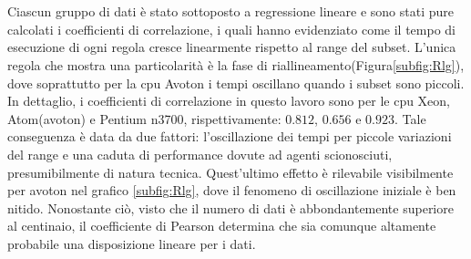 \begin{figure}[H]
\centering
{} \quad
{} \\
\end{figure}
\begin{figure}[H]
\ContinuedFloat
\centering
{} \quad
{} \\
\end{figure}
\begin{figure}[H]
\ContinuedFloat
\centering
{} 
\caption{}
\label{fig:Tdip}
\end{figure}

Ciascun gruppo di dati è stato sottoposto a regressione lineare e sono stati pure calcolati i coefficienti di correlazione, i quali hanno evidenziato come il tempo di esecuzione di ogni regola cresce linearmente rispetto al range del subset.
L'unica regola che mostra una particolarità è la fase di riallineamento(Figura\ref{subfig:Rlg}), dove soprattutto per la cpu Avoton i tempi oscillano quando i subset sono piccoli. 
In dettaglio, i coefficienti di correlazione in questo lavoro sono per le cpu Xeon, Atom(avoton) e Pentium n3700, rispettivamente: $0.812$, $0.656$ e $0.923$. 
Tale conseguenza è data da due fattori: l'oscillazione dei tempi per piccole variazioni del range e una caduta di performance dovute ad agenti scionosciuti, presumibilmente di natura tecnica.
Quest'ultimo effetto è rilevabile visibilmente per avoton nel grafico \ref{subfig:Rlg}, dove il fenomeno di oscillazione iniziale è ben nitido.
Nonostante ciò, visto che il numero di dati è abbondantemente superiore al centinaio, il coefficiente di Pearson determina che sia comunque altamente probabile una disposizione lineare per i dati.



